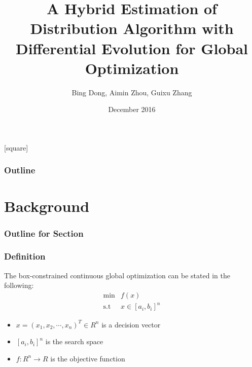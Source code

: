 \documentclass[xcolor=dvipsnames]{beamer}
\begin{document}
    \title[SSCI]{A Hybrid Estimation of Distribution Algorithm with Differential Evolution for Global Optimization}
    \author[B. Dong, A. Zhou, G. Zhang]{Bing Dong, Aimin Zhou, Guixu Zhang}
    \date{December 2016}
    \begin{frame}
        \titlepage
    \end{frame}
    [square]
    \begin{frame}
        \frametitle{Outline}
        \tableofcontents
    \end{frame}

    \section{Background}
    \begin{frame}
      \frametitle{Outline for Section \thesection}
      \tableofcontents[currentsection]
    \end{frame}

    \begin{frame}
    \frametitle{Definition}
    The box-constrained continuous global optimization can be stated in the following:
    \begin{equation}
    \begin{array}{rl}
    \mbox{min} & f(x)\\
    \mbox{s.t} & x\in[a_i,b_i]^n
    \end{array}
    \label{MOP}
    \end{equation}

    \begin{itemize}
    \item $x=(x_1, x_2, \cdots, x_n)^T\in{R^n}$ is a decision vector
    \item $[a_i, b_i]^n$ is the search space
    \item $f:R^n\to{R}$ is the objective function
    \end{itemize}
    \end{frame}
\end{document}
